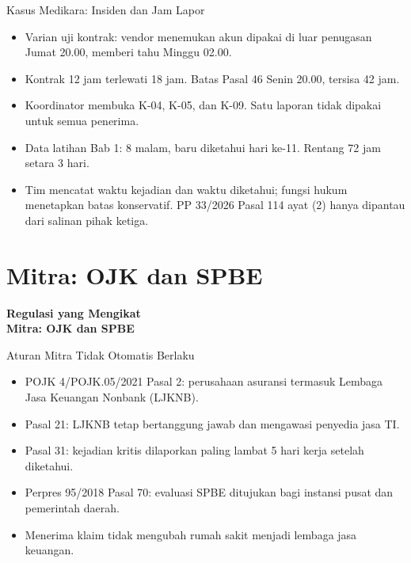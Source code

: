 \documentclass[aspectratio=169, table, 12pt]{beamer}
\begin{document}
\begin{frame}{{\Large Kasus Medikara: Insiden dan Jam Lapor}}
  \vspace{4pt}
  \small
  \begin{itemize}
    \item Varian uji kontrak: vendor menemukan akun dipakai di luar penugasan Jumat 20.00, memberi tahu Minggu 02.00.
    \item Kontrak 12 jam terlewati 18 jam. Batas Pasal 46 Senin 20.00, tersisa 42 jam.
    \item Koordinator membuka K-04, K-05, dan K-09. Satu laporan tidak dipakai untuk semua penerima.
    \item Data latihan Bab 1: 8 malam, baru diketahui hari ke-11. Rentang 72 jam setara 3 hari.
    \item Tim mencatat waktu kejadian dan waktu diketahui; fungsi hukum menetapkan batas konservatif. PP 33/2026 Pasal 114 ayat (2) hanya dipantau dari salinan pihak ketiga.
  \end{itemize}
\end{frame}

\section{Mitra: OJK dan SPBE}

\begin{frame}{\hfill}
  \centering
  \Huge{\textbf{Regulasi yang Mengikat\\Mitra: OJK dan SPBE}}
\end{frame}

\begin{frame}{{\Large Aturan Mitra Tidak Otomatis Berlaku}}
  \vspace{4pt}
  \small
  \begin{itemize}
    \item POJK 4/POJK.05/2021 Pasal 2: perusahaan asuransi termasuk Lembaga Jasa Keuangan Nonbank
          (LJKNB).
    \item Pasal 21: LJKNB tetap bertanggung jawab dan mengawasi penyedia jasa TI.
    \item Pasal 31: kejadian kritis dilaporkan paling lambat 5 hari kerja setelah diketahui.
    \item Perpres 95/2018 Pasal 70: evaluasi SPBE ditujukan bagi instansi pusat dan pemerintah daerah.
    \item Menerima klaim tidak mengubah rumah sakit menjadi lembaga jasa keuangan.
  \end{itemize}
\end{frame}
\end{document}
